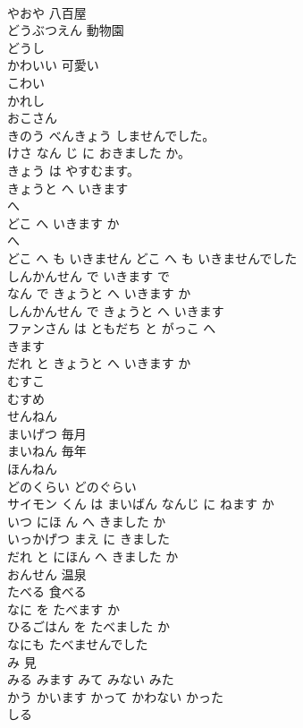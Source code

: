 \documentclass[8pt]{extreport}
\begin{document}
\begin{CJK}{UTF8}{min}
\\	やおや	八百屋
\\	どうぶつえん	動物園
\\	どうし	
\\	かわいい	可愛い
\\	こわい	
\\	かれし	
\\	おこさん	
\\	きのう べんきょう しませんでした。	
\\	けさ なん じ に おきました か。	
\\	きょう は やすむます。	
\\	きょうと へ いきます	
\\	へ 
\\	どこ へ いきます か	
\\	へ 
\\	どこ へ も いきません どこ へ も いきませんでした	
\\	しんかんせん で いきます	で 
\\	なん で きょうと へ いきます か	
\\	しんかんせん で きょうと へ いきます	
\\	ファンさん は ともだち と がっこ へ
\\	きます	
\\	だれ と きょうと へ いきます か	
\\	むすこ	
\\	むすめ	
\\	せんねん	
\\	まいげつ	毎月
\\	まいねん	毎年
\\	ほんねん	
\\	どのくらい どのぐらい	
\\	サイモン くん は まいばん なんじ に ねます か	
\\	いつ にほ ん へ きました か	
\\	いっかげつ まえ に きました	
\\	だれ と にほん へ きました か	
\\	おんせん	温泉
\\	たべる	食べる
\\	なに を たべます か	
\\	ひるごはん を たべました か	
\\	なにも たべませんでした	
\\	み	見
\\	みる	みます	みて	みない	みた	
\\	かう	かいます	かって	かわない	かった	
\\	しる	

\end{CJK}
\end{document}

